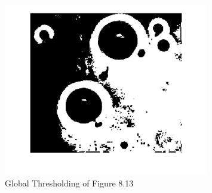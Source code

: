 \documentclass[11pt,oneside]{book}
\begin{document}
\begin{figure}[!htb]
   \centering  
   \includegraphics[width=0.8\textwidth]{images/9/basic.jpg}
   \caption{Global Thresholding of Figure 8.13}
\end{figure}
\end{document}
